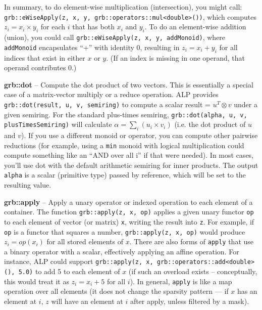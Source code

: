     In summary, to do element-wise multiplication (intersection), you might call:
    \texttt{grb::eWiseApply(z, x, y, grb::operators::mul<double>())},
    which computes $z_i = x_i \times y_i$ for each $i$ that has both $x_i$ and $y_i$. To do an element-wise addition (union), you could call
    \texttt{grb::eWiseApply(z, x, y, addMonoid)}, where \texttt{addMonoid} encapsulates “+” with identity 0, resulting in $z_i = x_i + y_i$ for all indices that exist in either $x$ or $y$. (If an index is missing in one operand, that operand contributes 0.)
\newline

      \textbf{grb::dot} – Compute the dot product of two vectors. This is essentially a special case of a matrix-vector multiply or a reduce operation. ALP provides \texttt{grb::dot(result, u, v, semiring)} to compute a scalar result = $u^T \otimes v$ under a given semiring. For the standard plus-times semiring, \texttt{grb::dot(alpha, u, v, plusTimesSemiring)} will calculate $\alpha = \sum_i (u_i \times v_i)$ (i.e. the dot product of $u$ and $v$). If you use a different monoid or operator, you can compute other pairwise reductions (for example, using a \texttt{min} monoid with logical multiplication could compute something like an “AND over all i” if that were needed). In most cases, you'll use dot with the default arithmetic semiring for inner products. The output \texttt{alpha} is a scalar (primitive type) passed by reference, which will be set to the resulting value.
\newline

      \textbf{grb::apply} – Apply a unary operator or indexed operation to each element of a container. The function \texttt{grb::apply(z, x, op)} applies a given unary functor \texttt{op} to each element of vector (or matrix) \texttt{x}, writing the result into \texttt{z}. For example, if \texttt{op} is a functor that squares a number, \texttt{grb::apply(z, x, op)} would produce $z_i = \textit{op}(x_i)$ for all stored elements of $x$. There are also forms of \texttt{apply} that use a binary operator with a scalar, effectively applying an affine operation. For instance, ALP could support \texttt{grb::apply(z, x, grb::operators::add<double>(), 5.0)} to add 5 to each element of $x$ (if such an overload exists – conceptually, this would treat it as $z_i = x_i + 5$ for all $i$). In general, \texttt{apply} is like a map operation over all elements (it does not change the sparsity pattern — if $x$ has an element at $i$, $z$ will have an element at $i$ after apply, unless filtered by a mask).

